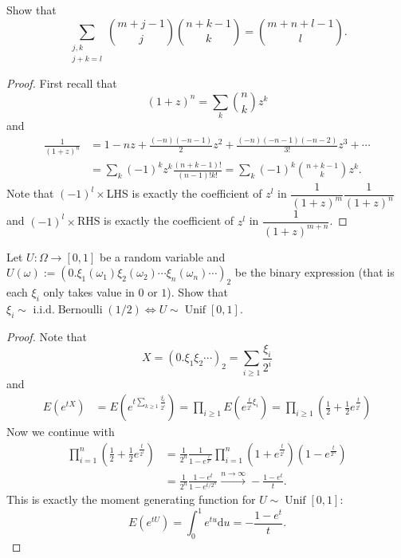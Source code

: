 \documentclass[11pt,singlecolumn, openany, citestyle=authoryear]{elegantbook}
\begin{document}
\begin{CJK}{UTF8}{gbsn}
\begin{exercise}
    Show that 
    $$
    \sum_{\substack{j,k\\ j+k=l}}\binom{m+j-1}{j}\binom{n+k-1}{k}=
    \binom{m+n+l-1}{l}.
    $$
\end{exercise}
\begin{proof}
    First recall that 
    $$
    (1+z)^n = \sum_k \binom{n}{k}z^k
    $$
    and 
    \begin{align*}
        \frac{1}{(1+z)^n}&= 1-nz+\frac{(-n)(-n-1)}{2}z^2+\frac{(-n)(-n-1)(-n-2)}{3!}z^3+
        \cdots\\
        &=\sum_k (-1)^k z^k \frac{(n+k-1)!}{(n-1)!k!}=\sum_k (-1)^k \binom{n+k-1}{k} z^k.
    \end{align*}
    Note that 
    $(-1)^l\times$LHS is exactly the coefficient of $z^l$ in $\dfrac{1}{(1+z)^m}\dfrac{1}{(1+z)^n}$ and 
    $(-1)^l\times$RHS is exactly the coefficient of $z^l$ in $\dfrac{1}{(1+z)^{m+n}}$.
\end{proof}

\begin{exercise}
    Let $U:\Omega \to [0,1]$ be a random variable and 
    $U(\omega):=(0.\xi_1(\omega_1)\xi_2(\omega_2)\cdots \xi_n(\omega_n)\cdots)_2$ be the 
    binary expression (that is each $\xi_i$ only takes value in $0$ or $1$). Show that 
    $\xi_i \sim \text{ i.i.d.} \operatorname{Bernoulli}(1/2) \iff U \sim \operatorname{Unif}[0,1]$.
\end{exercise}
\begin{proof}
    Note that 
    $$
    X=(0.\xi_1\xi_2\cdots)_2=\sum_{i\geqslant 1}\frac{\xi_i}{2^i}
    $$
    and \begin{align*}
        E(e^{tX})&=E(e^{t\sum_{k\geqslant 1}\frac{\xi_i}{2^i}})= \prod_{i\geqslant 1}E(e^{\frac{t}{2^i}\xi_i})
        =\prod_{i\geqslant 1}\left(\frac{1}{2}+\frac{1}{2}e^{\frac{t}{2^i}}\right)
    \end{align*}
    Now we continue with 
    \begin{align*}
        \prod_{i=1}^n\left(\frac{1}{2}+\frac{1}{2}e^{\frac{t}{2^i}}\right) &= 
        \frac{1}{2^n} \frac{1}{1-e^{\frac{t}{2^n}}}\prod_{i=1}^n \left(
            1+e^{\frac{t}{2^i}}
        \right)
        \left(
            1-e^{\frac{t}{2^n}}
        \right)\\
        &= \frac{1}{2^n}\frac{1-e^t}{1-e^{t/2^n}}\overset{n\to\infty}{\longrightarrow}-\frac{1-e^t}{t}.
    \end{align*}
    This is exactly the moment generating function for $U\sim \operatorname{Unif}[0,1]$: 
    $$
    E(e^{tU})=\int_{0}^1 e^{tu}\mathrm{d}u = -\frac{1-e^t}{t}.
    $$
\end{proof}


\end{CJK}
\end{document}
